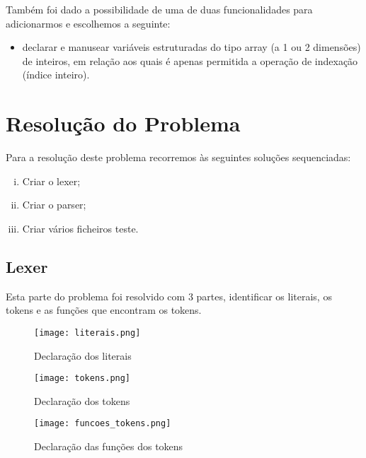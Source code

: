 \documentclass[11pt,a4paper]{report}%
\begin{document}
Também foi dado a possibilidade de uma de duas funcionalidades para adicionarmos e escolhemos a seguinte:

\begin{itemize}
  \item declarar e manusear variáveis estruturadas do tipo array (a 1 ou 2 dimensões) de inteiros, em relação aos quais
é apenas permitida a operação de indexação (índice inteiro).
\end{itemize}

\newpage
\section{Resolução do Problema} \label{sec:resProb}

Para a resolução deste problema recorremos às seguintes soluções sequenciadas:

\begin{enumerate}[i)]
     \item Criar o lexer;
     \item Criar o parser;
     \item Criar vários ficheiros teste.
  \end{enumerate}
  
  
  
\subsection{Lexer} \label{subsec:lexer}
Esta parte do problema foi resolvido com 3 partes, identificar os literais, os tokens e as funções que encontram os tokens.


\begin{figure}[htbp]
\centerline{\texttt{[image: literais.png]}}
\caption{Declaração dos literais}
\label{fig}
\end{figure}  

\begin{figure}[htbp]
\centerline{\texttt{[image: tokens.png]}}
\caption{Declaração dos tokens}
\label{fig}
\end{figure}  

\begin{figure}[htbp]
\centerline{\texttt{[image: funcoes\_tokens.png]}}
\caption{Declaração das funções dos tokens}
\label{fig}
\end{figure}  
\end{document}
